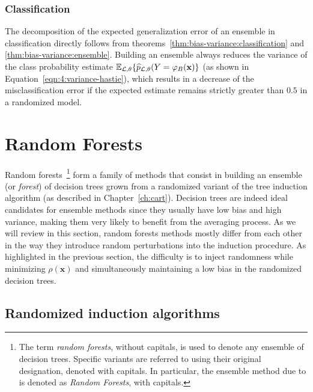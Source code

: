 \subsubsection{Classification}

The decomposition of the expected generalization error of an ensemble in
classification directly follows from theorems~\ref{thm:bias-variance:classification} and
\ref{thm:bias-variance:ensemble}.
Building an ensemble always reduces the variance of the class probability estimate
$\mathbb{E}_{{\cal L},\theta}\{ \widehat{p}_{{\cal
L},\theta}(Y=\varphi_B(\mathbf{x}) \}$ (as shown in Equation~\ref{eqn:4:variance-hastie}), which results in a decrease of the misclassification error
if the expected estimate remains strictly greater than $0.5$ in a
randomized model.


\section{Random Forests}
\label{sec:4:random-forests}

Random forests~\footnote{The term
\textit{random forests}, without capitals, is used to denote any ensemble of decision
trees. Specific variants are referred to using their original designation,
denoted with capitals. In particular, the ensemble method due to
\citet{breiman:2001} is denoted as \textit{Random Forests}, with capitals.}
form a family of methods that consist in building an ensemble (or
\textit{forest}) of decision trees grown from a randomized variant of the tree
induction algorithm (as described in Chapter~\ref{ch:cart}). Decision trees are
indeed ideal candidates for ensemble methods since they usually have low bias
and high variance, making them very likely to benefit from the averaging
process. As we will review in this section, random forests methods mostly
differ from each other in the way they introduce random perturbations into the
induction procedure. As highlighted in the previous section, the difficulty is
to inject randomness while minimizing $\rho(\mathbf{x})$ and
simultaneously maintaining a low bias in the randomized decision trees.

\subsection{Randomized induction algorithms}

